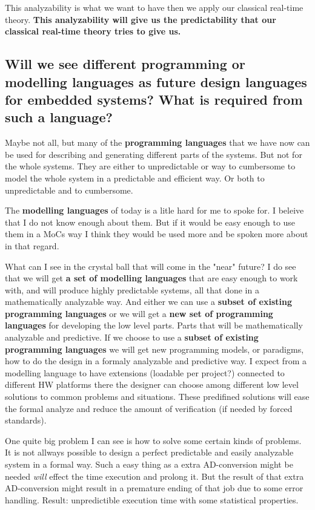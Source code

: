 \documentclass[10pt]{article}
\begin{document}
This analyzability is what we want to have then we apply our classical real-time theory. \textbf{This analyzability will give us the predictability that our classical real-time theory tries to give us.}

\subsection{Will we see different programming or modelling languages as future design languages for embedded systems? What is required from such a language?}

Maybe not all, but many of the \textbf{programming languages} that we have now can be used for describing and generating different parts of the systems. But not for the whole systems. They are either to unpredictable or way to cumbersome to model the whole system in a predictable and efficient way. Or both to unpredictable and to cumbersome.

\medskip

The \textbf{modelling languages} of today is a litle hard for me to spoke for. I beleive that I do not know enough about them. But if it would be easy enough to use them in a MoCs way I think they would be used more and be spoken more about in that regard.

\medskip

What can I see in the crystal ball that will come in the "near" future? I do see that we will get \textbf{a set of modelling languages} that are easy enough to work with, and will produce highly predictable systems, all that done in a mathematically analyzable way. And either we can use a \textbf{subset of existing programming languages} or we will get a \textbf{new set of programming languages} for developing the low level parts. Parts that will be mathematically analyzable and predictive. If we choose to use a \textbf{subset of existing programming languages} we will get new programming models, or paradigms, how to do the design in a formaly analyzable and predictive way. I expect from a modelling language to have extensions (loadable per project?) connected to different HW platforms there the designer can choose among different low level solutions to common problems and situations. These predifined solutions will ease the formal analyze and reduce the amount of verification (if needed by forced standards).

\medskip

One quite big problem I can see is how to solve some certain kinds of problems. It is not allways possible to design a perfect predictable and easily analyzable system in a formal way. Such a easy thing as a extra AD-conversion might be needed \emph{will} effect the time execution and prolong it. But the result of that extra AD-conversion might result in a premature ending of that job due to some error handling. Result: unpredictible execution time with some statistical properties.
\end{document}
